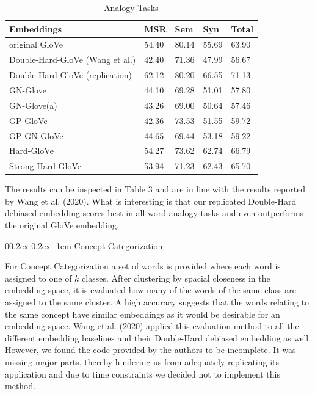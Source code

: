 \documentclass[
  english,
  man,floatsintext]{apa6}
\makeatletter
\let\oldparagraph\paragraph
\renewcommand{\paragraph}[1]{\oldparagraph{#1}\mbox{}}
\renewcommand{\paragraph}{\@startsection{paragraph}{4}{\parindent}%
  {0\baselineskip \@plus 0.2ex \@minus 0.2ex}%
  {-1em}%
  {\normalfont\normalsize\bfseries\itshape\typesectitle}}
\makeatother
\begin{document}
\begin{table}[tbp]

\begin{center}
\begin{threeparttable}

\caption{\label{tab:table 3}Analogy Tasks}

\begin{tabular}{lllll}
\toprule
Embeddings & MSR & Sem & Syn & Total\\
\midrule
original GloVe & 54.40 & 80.14 & 55.69 & 63.90\\
Double-Hard-GloVe (Wang et al.) & 42.40 & 71.36 & 47.99 & 56.67\\
Double-Hard-GloVe (replication) & 62.12 & 80.20 & 66.55 & 71.13\\
GN-Glove & 44.10 & 69.28 & 51.01 & 57.80\\
GN-Glove(a) & 43.26 & 69.00 & 50.64 & 57.46\\
GP-GloVe & 42.36 & 73.53 & 51.55 & 59.72\\
GP-GN-GloVe & 44.65 & 69.44 & 53.18 & 59.22\\
Hard-GloVe & 54.27 & 73.62 & 62.74 & 66.79\\
Strong-Hard-GloVe & 53.94 & 71.23 & 62.43 & 65.70\\
\bottomrule
\end{tabular}

\end{threeparttable}
\end{center}

\end{table}

The results can be inspected in Table 3 and are in line with the results reported by Wang et al. (2020). What is interesting is that our replicated Double-Hard debiased embedding scores best in all word analogy tasks and even outperforms the original GloVe embedding.

\hypertarget{concept-categorization}{%
\paragraph{Concept Categorization}\label{concept-categorization}}

For Concept Categorization a set of words is provided where each word is assigned to one of \(k\) classes. After clustering by spacial closeness in the embedding space, it is evaluated how many of the words of the same class are assigned to the same cluster. A high accuracy suggests that the words relating to the same concept have similar embeddings as it would be desirable for an embedding space.
Wang et al. (2020) applied this evaluation method to all the different embedding baselines and their Double-Hard debiased embedding as well. However, we found the code provided by the authors to be incomplete. It was missing major parts, thereby hindering us from adequately replicating its application and due to time constraints we decided not to implement this method.
\end{document}

